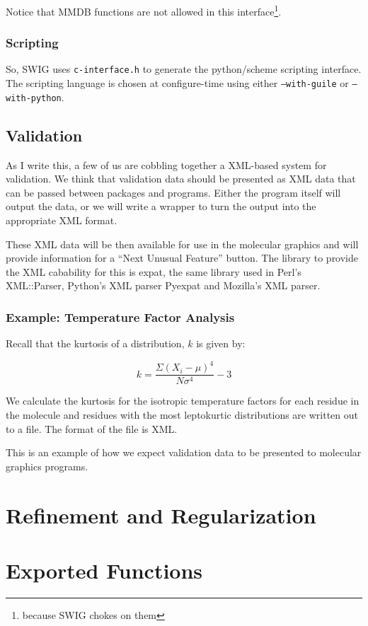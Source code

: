 \documentclass{book}
\begin{document}
Notice that MMDB functions are not allowed in
this interface\footnote{because SWIG chokes on them}. 

\subsection{Scripting}
So, SWIG uses \texttt{c-interface.h} to generate the python/scheme
scripting interface. The scripting language is chosen at
configure-time using either \texttt{--with-guile} or
\texttt{--with-python}.

\section{Validation}
As I write this, a few of us are cobbling together a XML-based system
for validation.  We think that validation data should be presented as
XML data that can be passed between packages and programs.  Either the
program itself will output the data, or we will write a wrapper to
turn the output into the appropriate XML format.  

These XML data will be then available for use in the molecular
graphics and will provide information for a ``Next Unusual Feature''
button.  The library to provide the XML cabability for this is expat,
the same library used in Perl's XML::Parser, Python's XML parser
Pyexpat and Mozilla's XML parser.

\subsection{Example: Temperature Factor Analysis}
Recall that the kurtosis of a distribution, $k$ is given by:

\begin{equation}
  \label{eq:kurtosis}
  k = \frac{\Sigma(X_i - \mu)^4} {N \sigma^4} - 3 
\end{equation}

We calculate the kurtosis for the isotropic temperature factors for
each residue in the molecule and residues with the most leptokurtic
distributions are written out to a file.  The format of the file is
XML.

This is an example of how we expect validation data to be presented to
molecular graphics programs.



\chapter{Refinement and Regularization}


\chapter{Exported Functions}


\end{document}
